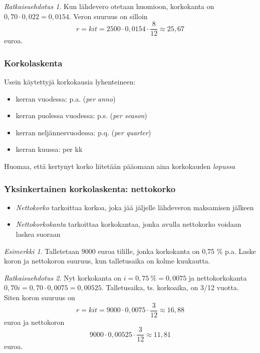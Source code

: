 \documentclass[]{beamer}\usepackage[]{graphicx}\usepackage[]{color}
\theoremstyle{remark}
\newtheorem{esim}{Esimerkki}
\newtheorem{ratkaisu}{Ratkaisuehdotus}
\begin{document}
\begin{frame}
    \pause
    \begin{ratkaisu}
        Kun lähdevero otetaan huomioon, korkokanta on \(0,70\cdot 0,022 = 0{,}0154\). \pause Veron suuruus on silloin
        \[
            r = kit = 2500\cdot 0{,}0154 \cdot \frac{8}{12}\approx 25,67
         \]
         euroa.
    \end{ratkaisu}
\end{frame}

\begin{frame}
    \frametitle{Korkolaskenta}
    \pause Usein käytettyjä korkokausia lyhenteineen:
    \begin{itemize}
        \item kerran vuodessa: p.a. (\emph{per anno}) \pause
        \item kerran puolessa vuodessa: p.s. (\emph{per season}) \pause
        \item kerran neljännesvuodessa: p.q. (\emph{per quarter}) \pause
        \item kerran kuussa: per kk \pause
    \end{itemize}
    Huomaa, että kertynyt korko liitetään pääomaan aina korkokauden \emph{lopussa}
\end{frame}


\begin{frame}
    \frametitle{Yksinkertainen korkolaskenta: nettokorko}
    \pause
    \begin{itemize}
        \item \emph{Nettokorko} tarkoittaa korkoa, joka jää jäljelle lähdeveron maksamisen jälkeen
        \item \emph{Nettokorkokanta} tarkoittaa korkokantaa, jonka avulla nettokorko voidaan laskea suoraan
    \end{itemize}
    \pause
    \begin{esim}
        Talletetaan 9000 euroa tilille, jonka korkokanta on 0,75 \% p.a.
        \pause Laske koron ja nettokoron suuruus, kun talletusaika on kolme kuukautta.
    \end{esim}
    \pause
\end{frame}

\begin{frame}
    \begin{ratkaisu}
        Nyt korkokanta on \pause $i = 0{,}75 \ \%  = 0{,}0075$ ja nettokorkokanta \pause $0{,}70i = 0{,}70 \cdot 0{,}0075 = 0,00525$.
        Talletusaika, ts. korkoaika, on 3/12 vuotta. Siten koron suuruus on
        \[
            r = kit = 9000\cdot 0,0075\cdot \frac{3}{12}\approx 16,88
        \]
        euroa ja nettokoron
        \[
            9000\cdot 0,00525\cdot\frac{3}{12}\approx 11,81
        \]
        euroa.
    \end{ratkaisu}
\end{frame}
\end{document}
